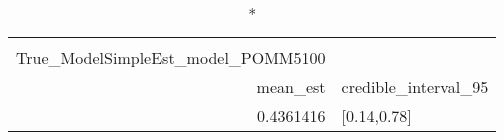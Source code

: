 \begin{longtable}{rl}
\caption*{
{\large Ssummarytable} \\ 
{\small True\_ModelSimpleEst\_model\_POMM5100}
} \\ 
\toprule
mean\_est & credible\_interval\_95 \\ 
\midrule
0.4361416 & [0.14,0.78] \\ 
\bottomrule
\end{longtable}

